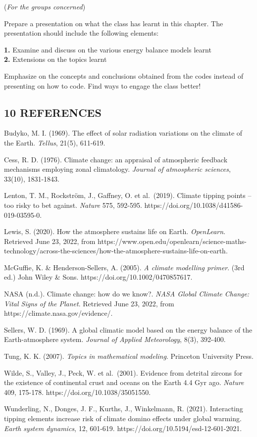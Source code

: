 \documentclass[
  letterpaper,
  DIV=11,
  numbers=noendperiod]{scrartcl}
\begin{document}
(\emph{For the groups concerned})

Prepare a presentation on what the class has learnt in this chapter. The
presentation should include the following elements:

\textbf{1.} Examine and discuss on the various energy balance models
learnt\\
\textbf{2.} Extensions on the topics learnt

Emphasize on the concepts and conclusions obtained from the codes
instead of presenting on how to code. Find ways to engage the class
better!

\hypertarget{references}{%
\subsection{10 \textbar{} REFERENCES}\label{references}}

Budyko, M. I. (1969). The effect of solar radiation variations on the
climate of the Earth. \emph{Tellus}, 21(5), 611-619.

Cess, R. D. (1976). Climate change: an appraisal of atmospheric feedback
mechanisms employing zonal climatology. \emph{Journal of atmospheric
sciences}, 33(10), 1831-1843.

Lenton, T. M., Rockström, J., Gaffney, O. et al.~(2019). Climate tipping
points -- too risky to bet against. \emph{Nature} 575, 592-595.
https://doi.org/10.1038/d41586-019-03595-0.

Lewis, S. (2020). How the atmosphere sustains life on Earth.
\emph{OpenLearn}. Retrieved June 23, 2022, from
https://www.open.edu/openlearn/science-maths-technology/across-the-sciences/how-the-atmosphere-sustains-life-on-earth.

McGuffie, K. \& Henderson-Sellers, A. (2005). \emph{A climate modelling
primer}. (3rd ed.) John Wiley \& Sons.
https://doi.org/10.1002/0470857617.

NASA (n.d.). Climate change: how do we know?. \emph{NASA Global Climate
Change: Vital Signs of the Planet}. Retrieved June 23, 2022, from
https://climate.nasa.gov/evidence/.

Sellers, W. D. (1969). A global climatic model based on the energy
balance of the Earth-atmosphere system. \emph{Journal of Applied
Meteorology}, 8(3), 392-400.

Tung, K. K. (2007). \emph{Topics in mathematical modeling}. Princeton
University Press.

Wilde, S., Valley, J., Peck, W. et al.~(2001). Evidence from detrital
zircons for the existence of continental crust and oceans on the Earth
4.4 Gyr ago. \emph{Nature} 409, 175-178.
https://doi.org/10.1038/35051550.

Wunderling, N., Donges, J. F., Kurths, J., Winkelmann, R. (2021).
Interacting tipping elements increase risk of climate domino effects
under global warming. \emph{Earth system dynamics}, 12, 601-619.
https://doi.org/10.5194/esd-12-601-2021.
\end{document}
